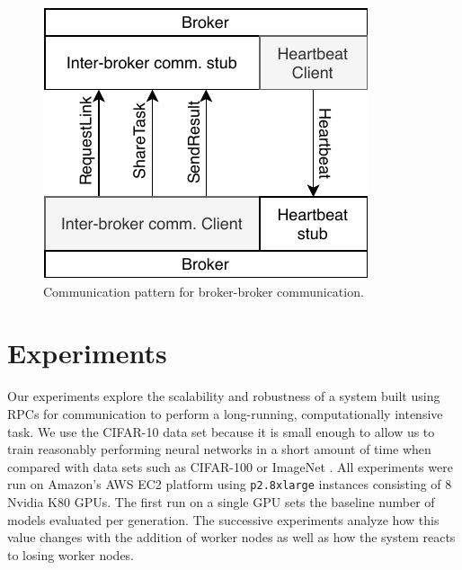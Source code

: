 \documentclass[conference]{IEEEtran}
\begin{document}
% 
% 
\begin{figure}
  \centering
  \includegraphics[width=.6\columnwidth]{img/broker_broker}
  \caption{Communication pattern for broker-broker communication.}
  \label{fig:broker-broker}
\end{figure}

\section{Experiments}
Our experiments explore the scalability and robustness
of a system built using RPCs for communication to perform a long-running,
computationally intensive task. We use the CIFAR-10 \cite{cifar10-data}
data set because it is small enough to allow us to train reasonably
performing neural networks in a short amount of time when compared with
data sets such as CIFAR-100 \cite{cifar100-data} or ImageNet \cite{imagenet_cvpr09}.
All experiments were run on Amazon's
AWS EC2 platform using \texttt{p2.8xlarge} instances consisting of 8
Nvidia K80 GPUs. The first run on a single GPU sets the baseline
number of models evaluated per generation. The successive experiments
analyze how this value changes with the addition of worker nodes as well
as how the system reacts to losing worker nodes.
\end{document}

